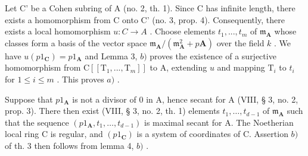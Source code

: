 Let C' be a Cohen subring of A (no. 2, th. 1). Since C has infinite length, there exists a homomorphism from C onto C' (no. 3, prop. 4). Consequently, there exists a local homomorphism \(u:C\to A\) . Choose elements \(t_{1},...,t_{m}\) of \(\mathfrak{m}_{\mathbf{A}}\) whose classes form a basis of the vector space \(\mathfrak{m}_{\mathbf{A}}/(\mathfrak{m}_{\mathbf{A}}^{2}+p\mathbf{A})\) over the field \(k\) . We have \(u(p1_{\mathbf{C}})=p1_{\mathbf{A}}\) and Lemma 3, \(b)\) proves the existence of a surjective homomorphism from \(\mathrm{C}[[\mathrm{T}_{1},..., \mathrm{T}_{m}]]\) to A, extending \(u\) and mapping \(\mathrm{T}_{i}\) to \(t_{i}\) for \(1\leqslant i\leqslant m\) . This proves \(a)\) .

Suppose that \(p1_{\mathbf{A}}\) is not a divisor of 0 in A, hence secant for A (VIII, § 3, no. 2, prop. 3). There then exist (VIII, § 3, no. 2, th. 1) elements \(t_1, \ldots, t_{d-1}\) of \(\mathfrak{m}_{\mathbf{A}}\) such that the sequence \((p1_{\mathbf{A}}, t_1, \ldots, t_{d-1})\) is maximal secant for A. The Noetherian local ring C is regular, and \((p1_{\mathbf{C}})\) is a system of coordinates of C. Assertion \(b)\) of th. 3 then follows from lemma 4, \(b)\) .


